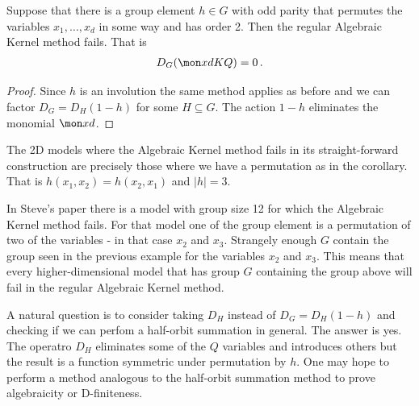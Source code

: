\begin{corollary} Suppose that there is a group element $h \in G$ with odd parity that permutes the variables $x_1,\ldots,x_d$ in some way and has order 2. Then the regular Algebraic Kernel method fails. That is
\begin{align}
D_G(\mon xd KQ) = 0\,.
\end{align}
\end{corollary}
\begin{proof} Since $h$ is an involution the same method applies as before and we can factor $D_G = D_H(1-h)$ for some $H \subseteq G$. The action $1-h$ eliminates the monomial $\mon xd$.
\end{proof}

\begin{example} The 2D models where the Algebraic Kernel method fails in its straight-forward construction are precisely those where we have a permutation as in the corollary. That is $h(x_1,x_2)= h(x_2,x_1)$ and $|h| = 3$.
\end{example}

\begin{example} In Steve's paper there is a model with group size 12 for which the Algebraic Kernel method fails. For that model one of the group element is a permutation of two of the variables - in that case $x_2$ and $x_3$. Strangely enough $G$ contain the group seen in the previous example for the variables $x_2$ and $x_3$. This means that every higher-dimensional model that has group $G$ containing the group above will fail in the regular Algebraic Kernel method.
\end{example}
A natural question is to consider taking $D_H$ instead of $D_G = D_H(1-h)$ and checking if we can perfom a half-orbit summation in general. The answer is yes. The operatro $D_H$ eliminates some of the $Q$ variables and introduces others but the result is a function symmetric under permutation by $h$. One may hope to perform a method analogous to the half-orbit summation method to prove algebraicity or D-finiteness.

